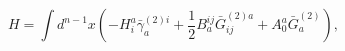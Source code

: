 \begin{equation}
H=\int d^{n-1}x\left( -H_{i}^{a}\bar{\gamma}_{a}^{(2)i}+\frac{1}{2}B_{a}^{ij}%
\bar{G}_{ij}^{(2)a}+A_{0}^{a}\bar{G}_{a}^{(2)}\right) ,  \label{i33}
\end{equation}

